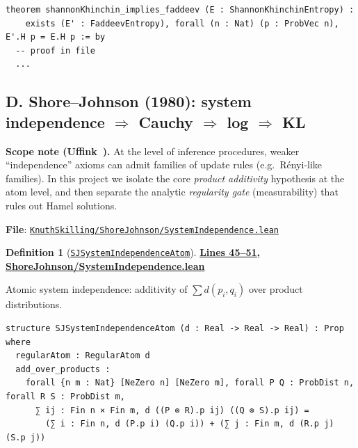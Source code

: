 \documentclass[11pt]{article}
\theoremstyle{definition}
\newtheorem{definition}[theorem]{Definition}
\theoremstyle{remark}
\begin{document}
\begin{lstlisting}[caption={Shannon--Khinchin -> Faddeev bridge}]
theorem shannonKhinchin_implies_faddeev (E : ShannonKhinchinEntropy) :
    exists (E' : FaddeevEntropy), forall (n : Nat) (p : ProbVec n), E'.H p = E.H p := by
  -- proof in file
  ...
\end{lstlisting}

\subsection*{D. Shore--Johnson (1980): system independence $\Rightarrow$ Cauchy $\Rightarrow$ log $\Rightarrow$ KL}
\label{app:shore-johnson}

\textbf{Scope note (Uffink~\cite{Uffink1995}).}
At the level of inference procedures, weaker ``independence'' axioms can admit families of update rules
(e.g.\ R\'enyi-like families).  In this project we isolate the core \emph{product additivity} hypothesis at the
atom level, and then separate the analytic \emph{regularity gate} (measurability) that rules out Hamel solutions.

\textbf{File}: \href{https://github.com/zariuq/ks-foundations-of-inference/blob/main/KnuthSkilling/ShoreJohnson/SystemIndependence.lean}{\texttt{KnuthSkilling/ShoreJohnson/SystemIndependence.lean}}

\begin{definition}[\href{https://github.com/zariuq/ks-foundations-of-inference/blob/main/KnuthSkilling/ShoreJohnson/SystemIndependence.lean\#L45}{\texttt{SJSystemIndependenceAtom}}]
\textbf{\href{https://github.com/zariuq/ks-foundations-of-inference/blob/main/KnuthSkilling/ShoreJohnson/SystemIndependence.lean\#L45-L51}{Lines 45--51, ShoreJohnson/SystemIndependence.lean}}

Atomic system independence: additivity of $\sum d(p_i,q_i)$ over product distributions.
\end{definition}

\begin{lstlisting}[caption={Shore--Johnson system independence (atom level)}]
structure SJSystemIndependenceAtom (d : Real -> Real -> Real) : Prop where
  regularAtom : RegularAtom d
  add_over_products :
    forall {n m : Nat} [NeZero n] [NeZero m], forall P Q : ProbDist n, forall R S : ProbDist m,
      ∑ ij : Fin n × Fin m, d ((P ⊗ R).p ij) ((Q ⊗ S).p ij) =
        (∑ i : Fin n, d (P.p i) (Q.p i)) + (∑ j : Fin m, d (R.p j) (S.p j))
\end{lstlisting}
\end{document}
